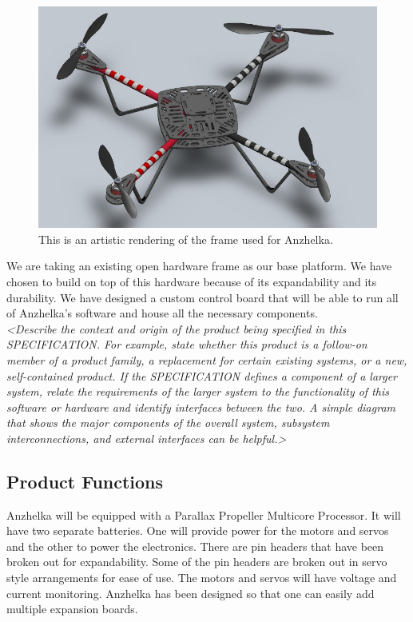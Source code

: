 \documentclass[english]{article}
\numberwithin{equation}{section} %
\begin{document}
\begin{figure}[h!]
  \centering
	\includegraphics[scale=.6]{elev_8_rendering.jpg}
  \caption{This is an artistic rendering of the frame used for Anzhelka.}
\end{figure}  

We are taking an existing open hardware frame as our base platform. We have chosen to build on top of this hardware because of its expandability and its durability. We have designed a custom control board that will be able to run all of Anzhelka's software and house all the necessary components.\\


\textit{<Describe the context and origin of the product being specified in this SPECIFICATION. For example, state whether this product is a follow-on member of a product family, a replacement for certain existing systems, or a new, self-contained product. If the SPECIFICATION defines a component of a larger system, relate the requirements of the larger system to the functionality of this software or hardware and identify interfaces between the two. A simple diagram that shows the major components of the overall system, subsystem interconnections, and external interfaces can be helpful.>}


\subsection{Product Functions}
Anzhelka will be equipped with a Parallax Propeller Multicore Processor. It will have two separate batteries. One will provide power for the motors and servos and the other to power the electronics. There are pin headers that have been broken out for expandability. Some of the pin headers are broken out in servo style arrangements for ease of use. The motors and servos will have voltage and current monitoring. Anzhelka has been designed so that one can easily add multiple expansion boards.
\end{document}
